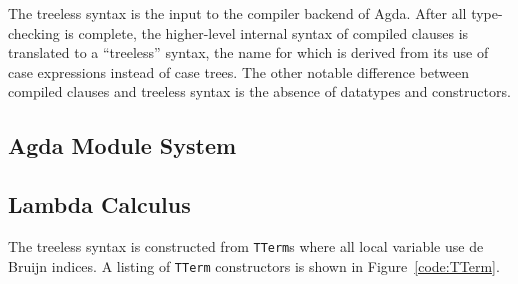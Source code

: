 
The treeless syntax is the input to the compiler backend of Agda. After all type-checking is complete, the higher-level internal syntax of compiled clauses is translated to a ``treeless'' syntax, the name for which is derived from its use of case expressions instead of case trees. The other notable difference between compiled clauses and treeless syntax is the absence of datatypes and constructors.\cite{agdahackage} %

\subsection{Agda Module System}

\subsection{Lambda Calculus}

The treeless syntax is constructed from \lstinline{TTerm}s %
where all local variable use de Bruijn indices. A listing of \lstinline{TTerm} constructors is shown in Figure~\ref{code:TTerm}.



